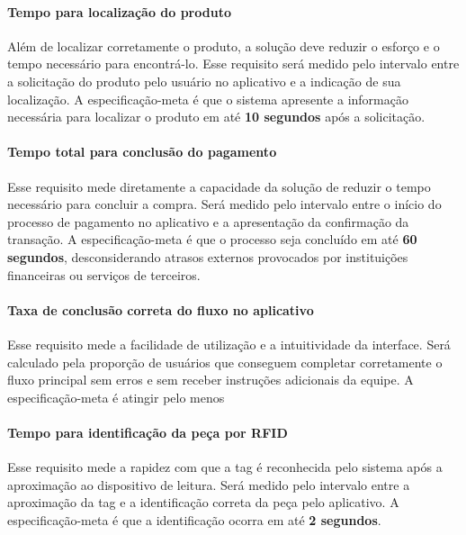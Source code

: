 \paragraph{Tempo para localização do produto}
\label{par:tempo_localizacao_produto}

Além de localizar corretamente o produto, a solução deve reduzir o esforço e o tempo necessário para encontrá-lo. Esse requisito será medido pelo intervalo entre a solicitação do produto pelo usuário no aplicativo e a indicação de sua localização. A especificação-meta é que o sistema apresente a informação necessária para localizar o produto em até \textbf{10 segundos} após a solicitação.


\paragraph{Tempo total para conclusão do pagamento}
\label{par:tempo_total_pagamento}

Esse requisito mede diretamente a capacidade da solução de reduzir o tempo necessário para concluir a compra. Será medido pelo intervalo entre o início do processo de pagamento no aplicativo e a apresentação da confirmação da transação. A especificação-meta é que o processo seja concluído em até \textbf{60 segundos}, desconsiderando atrasos externos provocados por instituições financeiras ou serviços de terceiros.



\paragraph{Taxa de conclusão correta do fluxo no aplicativo}
\label{par:taxa_fluxo_aplicativo}

Esse requisito mede a facilidade de utilização e a intuitividade da interface. Será calculado pela proporção de usuários que conseguem completar corretamente o fluxo principal sem erros e sem receber instruções adicionais da equipe. A especificação-meta é atingir pelo menos 

\paragraph{Tempo para identificação da peça por RFID}
\label{par:tempo_identificacao_tag}

Esse requisito mede a rapidez com que a tag é reconhecida pelo sistema após a aproximação ao dispositivo de leitura. Será medido pelo intervalo entre a aproximação da tag e a identificação correta da peça pelo aplicativo. A especificação-meta é que a identificação ocorra em até \textbf{2 segundos}.

